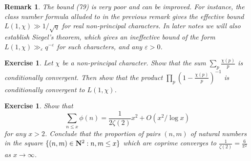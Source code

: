 \documentclass[10pt,reqno]{amsart}
\newtheorem{exercise}[theorem]{Exercise}
\newtheorem{remark}[theorem]{Remark}
\begin{document}
\begin{remark}
    The bound (79) is very poor and can be improved. For instance, the class number formula alluded to in the previous remark gives the effective bound $L(1,\chi) \gg 1/\sqrt{q}$ for real non-principal characters. In later notes we will also establish \emph{Siegel’s theorem}, which gives an \emph{ineffective} bound of the form $L(1,\chi) \gg_\varepsilon q^{-\varepsilon}$ for such characters, and any $\varepsilon>0$.
\end{remark}

\begin{exercise}
    Let $\chi$ be a non-principal character. Show that the sum $\sum_p \frac{\chi(p)}{p}$ is conditionally convergent. Then show that the product $\prod_p (1 - \frac{\chi(p)}{p})^{-1}$ is conditionally convergent to $L(1,\chi)$.
\end{exercise}

\begin{exercise}
    Show that
    \[  \sum_{n \leq x} \phi(n) = \frac{1}{2\zeta(2)} x^2 + O( x^2 / \log x )\]
    for any $x>2$. Conclude that the proportion of pairs $(n,m)$ of natural numbers in the square $\{ (n,m) \in {\bf N}^2: n,m \leq x\}$ which are coprime converges to $\frac{1}{\zeta(2)} = \frac{6}{\pi^2}$ as $x \rightarrow \infty$.
\end{exercise}
\end{document}
